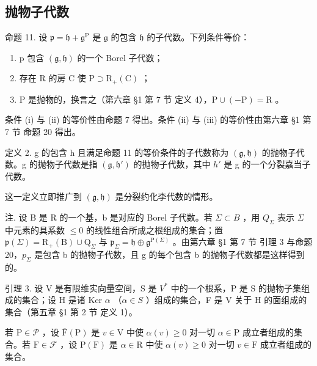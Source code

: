\subsection{抛物子代数}

命题 11. 设 \(\mathfrak{p} = \mathfrak{h} + \mathfrak{g}^{\mathrm{P}}\) 是 \(\mathfrak{g}\) 的包含 \(\mathfrak{h}\) 的子代数。下列条件等价：

\begin{enumerate}
\def\labelenumi{(\roman{enumi})}
\item
  p 包含 \((\mathfrak{g}, \mathfrak{h})\) 的一个 Borel 子代数；
\item
  存在 R 的房 C 使 \(\mathrm{P} \supset \mathrm{R}_{+}(\mathrm{C})\) ；
\item
  P 是抛物的，换言之（第六章 §1 第 7 节 定义 4），\(\mathrm{P} \cup (-\mathrm{P}) = \mathrm{R}\) 。
\end{enumerate}

条件 (i) 与 (ii) 的等价性由命题 7 得出。条件 (ii) 与 (iii) 的等价性由第六章 §1 第 7 节 命题 20 得出。

定义 2. g 的包含 h 且满足命题 11 的等价条件的子代数称为 \((\mathfrak{g}, \mathfrak{h})\) 的抛物子代数。g 的抛物子代数是指 \((\mathfrak{g}, \mathfrak{h}')\) 的抛物子代数，其中 \(h'\) 是 g 的一个分裂嘉当子代数。

这一定义立即推广到 \((\mathfrak{g}, \mathfrak{h})\) 是分裂约化李代数的情形。

注. 设 B 是 R 的一个基，b 是对应的 Borel 子代数。若 \(\Sigma \subset B\) ，用 \(Q_{\Sigma}\) 表示 \(\Sigma\) 中元素的具系数 \(\leq 0\) 的线性组合所成之根组成的集合；置 \(\mathfrak{p}(\Sigma) = \mathrm{R}_{+}(\mathrm{B}) \cup \mathrm{Q}_{\Sigma}\) 与 \(\mathfrak{p}_{\Sigma} = \mathfrak{h} \oplus \mathfrak{g}^{\mathrm{P}(\Sigma)}\) 。由第六章 §1 第 7 节 引理 3 与命题 20，\(p_{\Sigma}\) 是包含 b 的抛物子代数，且 g 的每个包含 b 的抛物子代数都是这样得到的。

引理 3. 设 V 是有限维实向量空间，S 是 \(V^{*}\) 中的一个根系，P 是 S 的抛物子集组成的集合；设 H 是诸 Ker \(\alpha\) （\(\alpha \in S\) ）组成的集合，F 是 V 关于 H 的面组成的集合（第五章 §1 第 2 节 定义 1）。

若 \(\mathrm{P} \in \mathcal{P}\) ，设 \(\overline{\mathrm{F}}(\mathrm{P})\) 是 \(v \in \mathrm{V}\) 中使 \(\alpha(v) \geq 0\) 对一切 \(\alpha \in \mathrm{P}\) 成立者组成的集合。若 \(\mathrm{F} \in \mathcal{F}\) ，设 \(\mathrm{P}(\mathrm{F})\) 是 \(\alpha \in \mathrm{R}\) 中使 \(\alpha(v) \geq 0\) 对一切 \(v \in \mathrm{F}\) 成立者组成的集合。


